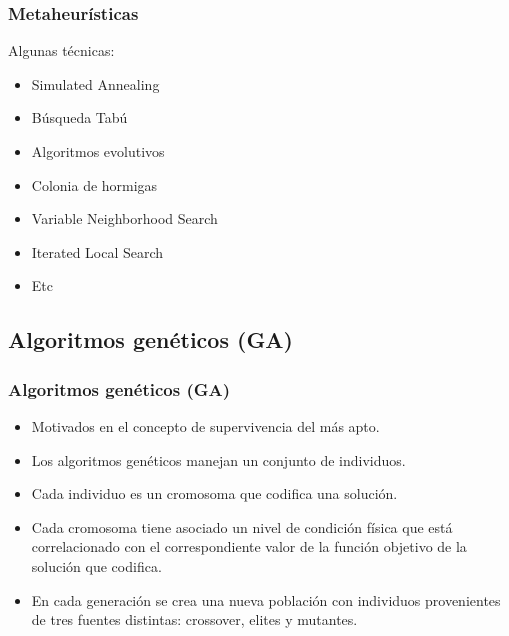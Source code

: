 \documentclass{beamer}
\begin{document}

\begin{frame}
\frametitle{Metaheurísticas}

Algunas técnicas:

\begin{itemize}
    \item Simulated Annealing
    \pause
    \item Búsqueda Tabú
    \pause
    \item Algoritmos evolutivos
    \pause
    \item Colonia de hormigas
    \pause
    \item Variable Neighborhood Search
    \pause
    \item Iterated Local Search
    \pause
    \item Etc
\end{itemize}

\end{frame}


\subsection{Algoritmos genéticos (GA)}

\begin{frame}
\frametitle{Algoritmos genéticos (GA)}

\begin{itemize}
    \item Motivados en el concepto de supervivencia del más apto.
    \pause
    \item Los algoritmos genéticos manejan un conjunto de individuos.
    \pause
    \item Cada individuo es un cromosoma que codifica una solución.
    \pause
    \item Cada cromosoma tiene asociado un nivel de condición física que está correlacionado con el correspondiente valor de la función objetivo de la solución que codifica.
    \pause
    \item En cada generación se crea una nueva población con individuos provenientes de tres fuentes distintas: crossover, elites y mutantes.
\end{itemize}

\end{frame}

\end{document}
